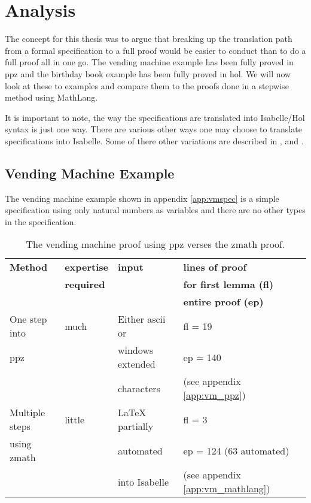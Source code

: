 \chapter{Analysis}
\label{ch:analysis}

The concept for this thesis was to argue that breaking up the translation path from a formal specification to a full proof would be easier to conduct than to do a full proof all in one go. The vending machine example has been fully proved in \gls{ppz} and the birthday book example has been fully proved in \gls{hol}. We will now look at these to examples and compare them to the proofs done in a stepwise method using MathLang.

It is important to note, the way the specifications are translated into Isabelle/Hol syntax is just one way. There are various other ways one may choose to translate specifications into Isabelle. Some of there other variations are described in \cite{Kolyang1996}, \cite{Kolyang86towardsa} and \cite{hol-z}.

\section{Vending Machine Example}

The vending machine example shown in appendix \ref{app:vmspec} is a simple specification using only natural numbers as variables and there are no other types in the specification. 

\begin{table}[H]
\begin{center}
\begin{tabular}{| l || l | l | l | l |}
\hline
\textbf{Method} & \textbf{expertise} &  \textbf{input} & \textbf{lines of proof}  \\
& \textbf{required} & & \textbf{for first lemma (fl)}  \\
& & & \textbf{entire proof (ep)} \\
\hline
One step into & much & Either ascii or & fl = 19  \\
\gls{ppz} & & windows extended & ep = 140 \\
& & characters & (see appendix \ref{app:vm_ppz})\\
\hline
Multiple steps & little & \LaTeX{} partially & fl = 3  \\
using \gls{zmath} & & automated & ep = 124 (63 automated) \\
& & into Isabelle & (see appendix \ref{app:vm_mathlang}) \\
\hline
\end{tabular}
\end{center}
\caption{The vending machine proof using \gls{ppz} verses the \gls{zmath} proof.}
\label{tab:comparevm}
\end{table}

